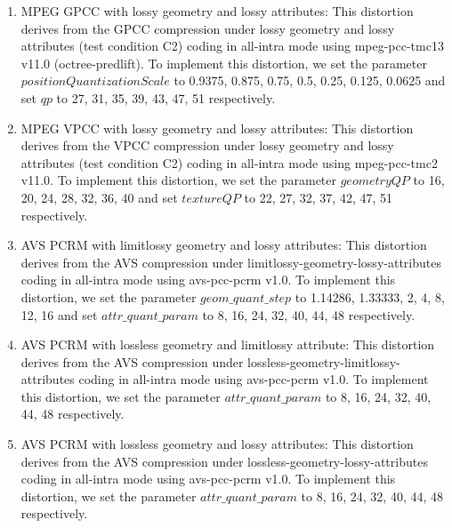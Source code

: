 \documentclass[acmsmall]{acmart}
\begin{document}
\begin{enumerate}
  \item {\sf MPEG GPCC with lossy geometry and lossy attributes}: This distortion derives from the GPCC compression under lossy geometry and lossy attributes (test condition C2) coding in all-intra mode using mpeg-pcc-tmc13 v11.0 (octree-predlift). To implement this distortion, we set the parameter $positionQuantizationScale$ to 0.9375, 0.875, 0.75, 0.5, 0.25, 0.125, 0.0625 and set $qp$ to 27, 31, 35, 39, 43, 47, 51 respectively.

  \item {\sf MPEG VPCC with lossy geometry and lossy attributes}:  This distortion derives from the VPCC compression under lossy geometry and lossy attributes (test condition C2) coding in all-intra mode using mpeg-pcc-tmc2 v11.0. To implement this distortion, we set the parameter $geometryQP$ to 16, 20, 24, 28, 32, 36, 40 and set $textureQP$ to 22, 27, 32, 37, 42, 47, 51 respectively.
  \item {\sf AVS PCRM with limitlossy geometry and lossy attributes}: This distortion derives from the AVS compression under limitlossy-geometry-lossy-attributes coding in all-intra mode using avs-pcc-pcrm v1.0. To implement this distortion, we set the parameter $geom\_quant\_step$ to 1.14286, 1.33333, 2, 4, 8, 12, 16 and set $attr\_quant\_param$ to 8, 16, 24, 32, 40, 44, 48 respectively.
  \item {\sf AVS PCRM with lossless geometry and limitlossy attribute}: This distortion derives from the AVS compression under lossless-geometry-limitlossy-attributes coding in all-intra mode using avs-pcc-pcrm v1.0. To implement this distortion, we set the parameter $attr\_quant\_param$ to 8, 16, 24, 32, 40, 44, 48 respectively.
  \item {\sf AVS PCRM with lossless geometry and lossy attributes}: This distortion derives from the AVS compression under lossless-geometry-lossy-attributes coding in all-intra mode using avs-pcc-pcrm v1.0. To implement this distortion, we set the parameter $attr\_quant\_param$ to 8, 16, 24, 32, 40, 44, 48 respectively.

\end{enumerate}
\end{document}
